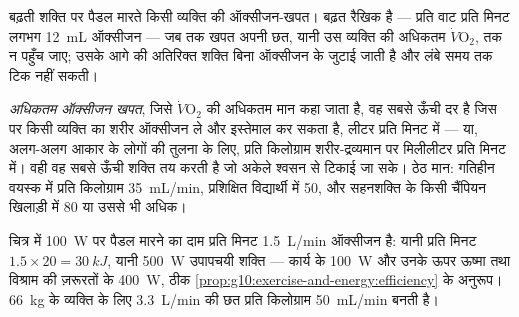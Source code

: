 \begin{omfigure}

{\small बढ़ती शक्ति पर पैडल मारते किसी व्यक्ति की ऑक्सीजन-खपत। बढ़त रैखिक
है --- प्रति वाट प्रति मिनट लगभग \qty{12}{mL} ऑक्सीजन --- जब तक खपत अपनी
छत, यानी उस व्यक्ति की अधिकतम $\dot V\!\mathrm{O_2}$, तक न पहुँच जाए;
उसके आगे की अतिरिक्त शक्ति बिना ऑक्सीजन के जुटाई जाती है और लंबे समय तक
टिक नहीं सकती।}
\end{omfigure}

\begin{definition}\label{def:g10:exercise-and-energy:vo2max}
\emph{अधिकतम ऑक्सीजन खपत}, जिसे
$\dot V\!\mathrm{O_2}$ की अधिकतम मान कहा जाता है, वह सबसे ऊँची दर है जिस
पर किसी व्यक्ति का शरीर ऑक्सीजन ले और इस्तेमाल कर सकता है, लीटर प्रति
मिनट में --- या, अलग-अलग आकार के लोगों की तुलना के लिए, प्रति किलोग्राम
शरीर-द्रव्यमान पर मिलीलीटर प्रति मिनट में। वही वह सबसे ऊँची शक्ति तय करती
है जो अकेले श्वसन से टिकाई जा सके। ठेठ मान: गतिहीन वयस्क में प्रति
किलोग्राम \qty{35}{mL/min}, प्रशिक्षित विद्यार्थी में \num{50}, और
सहनशक्ति के किसी चैंपियन खिलाड़ी में \num{80} या उससे भी अधिक।
\end{definition}

\begin{example}[वक्र पढ़ना]\label{ex:g10:exercise-and-energy:reading}
चित्र में \qty{100}{W} पर पैडल मारने का दाम प्रति मिनट \qty{1.5}{L/min}
ऑक्सीजन है: यानी प्रति मिनट $1.5 \times 20 = \qty{30}{kJ}$, यानी
\qty{500}{W} उपापचयी शक्ति --- कार्य के \qty{100}{W} और उनके ऊपर ऊष्मा
तथा विश्राम की ज़रूरतों के \qty{400}{W}, ठीक
\cref{prop:g10:exercise-and-energy:efficiency} के अनुरूप।
\qty{66}{kg} के व्यक्ति के लिए \qty{3.3}{L/min} की छत प्रति किलोग्राम
\qty{50}{mL/min} बनती है।
\end{example}

